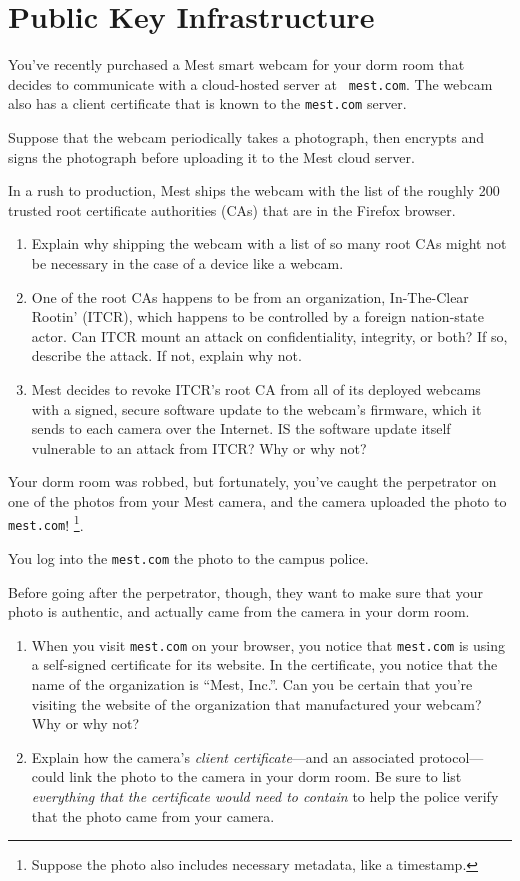 \newpage
\section{Public Key Infrastructure}

You've recently purchased a Mest smart webcam for your
dorm room that decides to communicate with a cloud-hosted server at {\tt
  mest.com}. The webcam also has a client certificate that is known
to the {\tt mest.com} server. 

Suppose that the webcam periodically takes a photograph, then encrypts
and signs the photograph before uploading it to the Mest cloud server.

In a rush to production, Mest ships the webcam with the list of
the roughly 200 trusted root certificate authorities (CAs) that are in the
Firefox browser.

\begin{enumerate}
\item Explain why shipping the webcam with a list of so many root
  CAs might not be necessary in the case of a device like a webcam.
\item One of the root CAs happens to be from an organization,
  In-The-Clear Rootin' (ITCR), which happens to be controlled by a
  foreign nation-state actor.  Can ITCR mount an attack on
  confidentiality, integrity, or both?  If so, describe the attack. If
  not, explain why not.
\item Mest decides to revoke ITCR's root CA from all of its deployed
  webcams with a signed, secure software update to the webcam's
  firmware, which it sends to each camera over the Internet. IS the
  software update itself vulnerable to an attack from ITCR? Why or why
  not? 
\end{enumerate}
\eprob

\newpage
{} Your dorm room was robbed, but fortunately, you've caught the
perpetrator on one of the photos from your Mest camera, and the camera
uploaded the photo to {\tt mest.com}! \footnote{Suppose the
photo also includes necessary metadata, like a timestamp.}.

You log into the {\tt mest.com} the photo to the campus police.  

Before going after the perpetrator, though, they want to make sure that your
photo is authentic, and actually came from the camera in your dorm
room. 

\begin{enumerate}
\item When you visit {\tt mest.com} on your browser, you notice that
  {\tt mest.com} is using a self-signed 
  certificate for its website. In the certificate, you notice that the
  name of the organization is ``Mest, Inc.''. Can you be certain that
  you're visiting the website of the organization that manufactured
  your webcam?  Why or why not?
\item Explain how the camera's {\em client certificate}---and
  an associated protocol---could link the photo to the camera in your
  dorm room. Be sure to list {\em everything that the certificate would
    need to contain} to help the police verify that the photo came from
  your camera.
\end{enumerate}
\eprob

